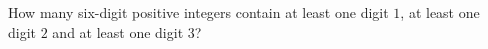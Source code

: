 How many six-digit positive integers contain at least one digit $1$, at least one digit $2$ and at least one digit $3$?
